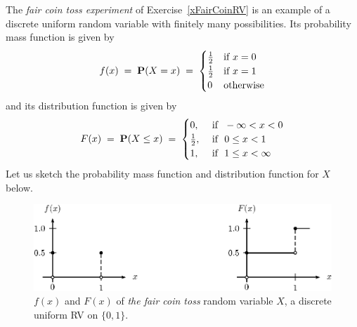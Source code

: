 \begin{example}\label{ExFairCoinRV}
The {\em fair coin toss experiment} of Exercise~\ref{xFairCoinRV} is an example of a discrete uniform random variable with finitely many possibilities. 
Its probability mass function is given by 
\[f(x)\;=\;\mathbf{P}(X=x)\;=\;
\begin{cases}
\frac{1}{2} & \text{if } x=0\\
\frac{1}{2} & \text{if } x=1\\
0 & \text{otherwise}
\end{cases}\] 
and its distribution function is given by
\[F(x)\; = \;\mathbf{P}(X \leq x) \;=\;
\begin{cases}
 0, & \text{ if } \ -\infty < x < 0\\
 \frac{1}{2}, & \text{ if } \ 0 \leq x < 1\\
 1,
& \text{ if } \ 1 \leq x < \infty
\end{cases}
\]
Let us sketch the probability mass function and distribution function for $X$ below. 
\begin{figure}[htbp]
\begin{center}
\includegraphics{pstricks/faircoinfF}
\caption{$f(x)$ and $F(x)$ of {\em the fair coin toss} random variable $X$, a discrete uniform RV on $\{0,1\}$.}
\end{center}
\end{figure}
\end{example}

